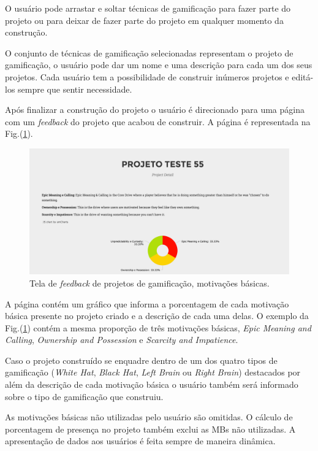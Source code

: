 O usuário pode arrastar e soltar técnicas de gamificação para fazer parte do projeto ou para deixar de fazer parte do projeto em qualquer momento da construção. 

O conjunto de técnicas de gamificação selecionadas representam o projeto de gamificação, o usuário pode dar um nome e uma descrição para cada um dos seus projetos. Cada usuário tem a possibilidade de construir inúmeros projetos e editá-los sempre que sentir necessidade.\newpage

Após finalizar a construção do projeto o usuário é direcionado para uma página com um \textit{feedback} do projeto que acabou de construir. A página é representada na Fig.(\ref{fig11}). 

\begin{figure}[h]
	\centering
		\includegraphics[keepaspectratio=true,scale=0.4]{figuras/detail.png}
	\caption{Tela de \textit{feedback} de projetos de gamificação, motivações básicas.\label{fig11}}
\end{figure}


A página contém um gráfico que informa a porcentagem de cada motivação básica presente no projeto criado e a descrição de cada uma delas. O exemplo da Fig.(\ref{fig11}) contém a mesma proporção de três motivações básicas, \textit{Epic Meaning and Calling}, \textit{Ownership and Possession} e \textit{Scarcity and Impatience}. 

Caso o projeto construído se enquadre dentro de um dos quatro tipos de gamificação (\textit{White Hat}, \textit{Black Hat}, \textit{Left Brain} ou \textit{Right Brain}) destacados por \cite{chou2015actionable}  além da descrição de cada motivação básica o usuário também será informado sobre o tipo de gamificação que construiu.


As motivações básicas não utilizadas pelo usuário são omitidas. O cálculo de porcentagem de presença no projeto também exclui as MBs não utilizadas. A apresentação de dados aos usuários é feita sempre de maneira dinâmica. 

